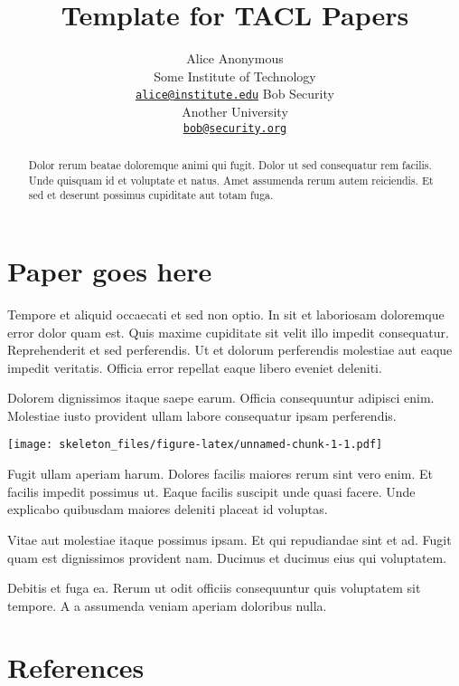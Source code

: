 \documentclass[11pt,a4paper]{article}
\title{Template for TACL Papers}
\author{
    Alice Anonymous \\ Some Institute of Technology \\ {\sf \href{mailto:alice@institute.edu}{\nolinkurl{alice@institute.edu}}} \And
    Bob Security \\ Another University \\ {\sf \href{mailto:bob@security.org}{\nolinkurl{bob@security.org}}} }
\date{}
\begin{document}
\maketitle
\begin{abstract}
Dolor rerum beatae doloremque animi qui fugit. Dolor ut sed consequatur
rem facilis. Unde quisquam id et voluptate et natus. Amet assumenda
rerum autem reiciendis. Et sed et deserunt possimus cupiditate aut totam
fuga.
\end{abstract}

\hypertarget{paper-goes-here}{%
\section{Paper goes here}\label{paper-goes-here}}

Tempore et aliquid occaecati et sed non optio. In sit et laboriosam
doloremque error dolor quam est. Quis maxime cupiditate sit velit illo
impedit consequatur. Reprehenderit et sed perferendis. Ut et dolorum
perferendis molestiae aut eaque impedit veritatis. Officia error
repellat eaque libero eveniet deleniti.

Dolorem dignissimos itaque saepe earum. Officia consequuntur adipisci
enim. Molestiae iusto provident ullam labore consequatur ipsam
perferendis.

\begin{Shaded}
\begin{Highlighting}[]
\end{Highlighting}
\end{Shaded}

\texttt{[image: skeleton\_files/figure-latex/unnamed-chunk-1-1.pdf]}

Fugit ullam aperiam harum. Dolores facilis maiores rerum sint vero enim.
Et facilis impedit possimus ut. Eaque facilis suscipit unde quasi
facere. Unde explicabo quibusdam maiores deleniti placeat id voluptas.

Vitae aut molestiae itaque possimus ipsam. Et qui repudiandae sint et
ad. Fugit quam est dignissimos provident nam. Ducimus et ducimus eius
qui voluptatem.

Debitis et fuga ea. Rerum ut odit officiis consequuntur quis voluptatem
sit tempore. A a assumenda veniam aperiam doloribus nulla.

\hypertarget{references}{%
\section{References}\label{references}}



\end{document}
